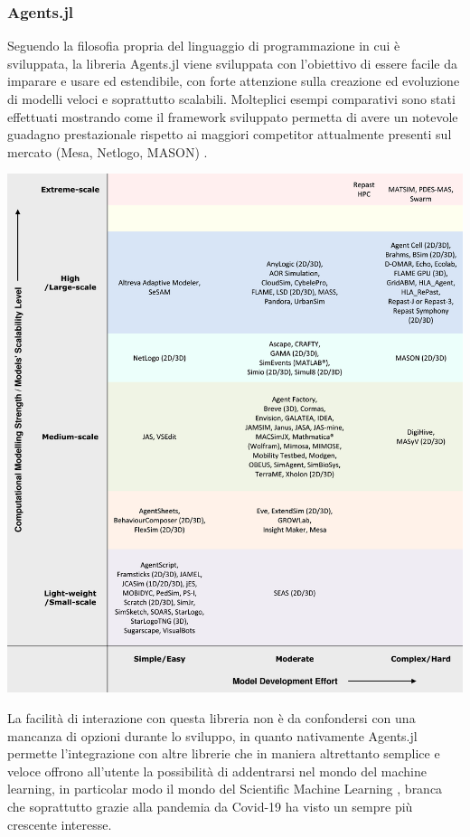 \subsubsection{Agents.jl}
Seguendo la filosofia propria del linguaggio di programmazione 
in cui è sviluppata, la libreria Agents.jl \cite{Agents.jl} 
viene sviluppata con l’obiettivo di essere facile da imparare e 
usare ed estendibile, con forte attenzione sulla creazione ed 
evoluzione di modelli veloci e soprattutto scalabili. 
Molteplici esempi comparativi sono stati effettuati mostrando 
come il framework sviluppato permetta di avere un notevole 
guadagno prestazionale rispetto ai maggiori competitor 
attualmente presenti sul mercato (Mesa, Netlogo, MASON) 
\cite{ABAR201713}.

\begin{minipage}{\linewidth}
    \centering
    \includegraphics[width=\textwidth]{img/1-s2.0-S1574013716301198-gr1_lrg.jpg}
    \label{fig:Comparative_table}
\end{minipage}

La facilità di interazione con questa libreria non è da 
confondersi con una mancanza di opzioni durante lo sviluppo, 
in quanto nativamente Agents.jl permette l’integrazione con 
altre librerie che in maniera altrettanto semplice e veloce 
offrono all’utente la possibilità 
di addentrarsi nel mondo del machine learning, in particolar 
modo il mondo del Scientific Machine Learning 
\cite{rackauckas2017differentialequations}, 
branca che soprattutto grazie alla pandemia da Covid-19 ha 
visto un sempre più crescente interesse. 

